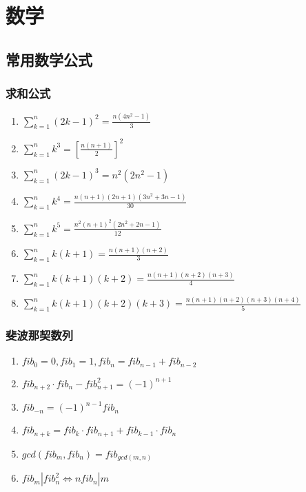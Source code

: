 \documentclass[a4paper]{article}
\begin{document}


\section{数学}


\subsection{常用数学公式}

\subsubsection{求和公式}

\begin{enumerate}
	\item $\sum_{k=1}^{n}(2k-1)^2 = \frac{n(4n^2-1)}{3}	$
	\item $\sum_{k=1}^{n}k^3 = [\frac{n(n+1)}{2}]^2	$
	\item $\sum_{k=1}^{n}(2k-1)^3 = n^2(2n^2-1)	$
	\item $\sum_{k=1}^{n}k^4 = \frac{n(n+1)(2n+1)(3n^2+3n-1)}{30}  $
	\item $\sum_{k=1}^{n}k^5 = \frac{n^2(n+1)^2(2n^2+2n-1)}{12}	$
	\item $\sum_{k=1}^{n}k(k+1) = \frac{n(n+1)(n+2)}{3}	$
	\item $\sum_{k=1}^{n}k(k+1)(k+2) = \frac{n(n+1)(n+2)(n+3)}{4} $
	\item $\sum_{k=1}^{n}k(k+1)(k+2)(k+3) = \frac{n(n+1)(n+2)(n+3)(n+4)}{5} $
\end{enumerate}

\subsubsection{斐波那契数列}

\begin{enumerate}
	\item $fib_0=0, fib_1=1, fib_n=fib_{n-1}+fib_{n-2}$
	\item $fib_{n+2} \cdot fib_n-fib_{n+1}^2=(-1)^{n+1}$
	\item $fib_{-n}=(-1)^{n-1}fib_n$
	\item $fib_{n+k}=fib_k \cdot fib_{n+1}+fib_{k-1} \cdot fib_n$
	\item $gcd(fib_m, fib_n)=fib_{gcd(m, n)}$
	\item $fib_m|fib_n^2\Leftrightarrow nfib_n|m$
\end{enumerate}
\end{document}
